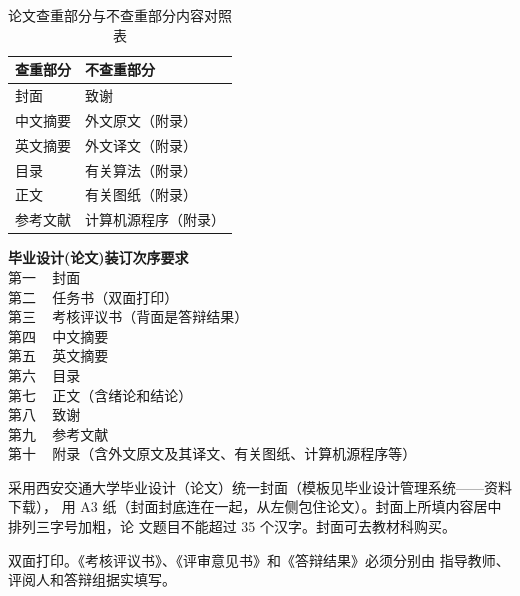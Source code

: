 \begin{table}[!h]
	\renewcommand{\arraystretch}{1.2}
	\centering\wuhao
	\caption{论文查重部分与不查重部分内容对照表} \label{tab_check} \vspace{2mm}
	\begin{tabularx}{\textwidth} { >{\centering\arraybackslash}X >{\centering\arraybackslash}X }
	\toprule[1.5pt]
		查重部分 & 不查重部分 \\
	\midrule[1pt]
		封面        &   致谢                \\
		中文摘要    &   外文原文（附录）    \\
		英文摘要    &   外文译文（附录）    \\
		目录        &   有关算法（附录）    \\
		正文        &   有关图纸（附录）    \\
		参考文献    &   计算机源程序（附录）\\    
	\bottomrule[1.5pt]
	\end{tabularx}
\end{table}

\noindent \textbf{毕业设计(论文)装订次序要求} \\
第一 ~ 封面 \\
第二 ~ 任务书（双面打印） \\
第三 ~ 考核评议书（背面是答辩结果） \\
第四 ~ 中文摘要 \\
第五 ~ 英文摘要 \\
第六 ~ 目录 \\
第七 ~ 正文（含绪论和结论） \\
第八 ~ 致谢 \\
第九 ~ 参考文献 \\
第十 ~ 附录（含外文原文及其译文、有关图纸、计算机源程序等）




采用西安交通大学毕业设计（论文）统一封面（模板见毕业设计管理系统——资料下载）， 用 A3 纸（封面封底连在一起，从左侧包住论文）。封面上所填内容居中排列三字号加粗，论 文题目不能超过 35 个汉字。封面可去教材科购买。



双面打印。《考核评议书》、《评审意见书》和《答辩结果》必须分别由 指导教师、评阅人和答辩组据实填写。


